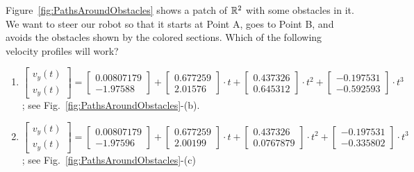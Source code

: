 \begin{example} Figure~\ref{fig:PathsAroundObstacles} shows a patch of $\mathbb R^2$ with some obstacles in it. We want to steer our robot so that it starts at Point A, goes to Point B, and avoids the obstacles shown by the colored sections. Which of the following velocity profiles will work? 

\begin{enumerate}[label=(\roman*)]
\setlength{\itemsep}{.2cm}
\item $\begin{bmatrix} v_y(t) \\ v_y(t)\end{bmatrix} =  
        \begin{bmatrix}      0.00807179 \\ -1.97588  \end{bmatrix}  + 
        \begin{bmatrix}      0.677259   \\  2.01576 \end{bmatrix} \cdot t 
        + \begin{bmatrix}   0.437326  \\   0.645312 \end{bmatrix} \cdot t^2  
        + \begin{bmatrix}   -0.197531  \\  -0.592593 \end{bmatrix} \cdot  t^3 
        $; see Fig.~\ref{fig:PathsAroundObstacles}-(b).

    \item $\begin{bmatrix} v_y(t) \\ v_y(t)\end{bmatrix} =  
    \begin{bmatrix}    0.00807179 \\ -1.97596  \end{bmatrix}  + 
        \begin{bmatrix}   0.677259   \\  2.00199\end{bmatrix} \cdot t +
        \begin{bmatrix}  0.437326   \\  0.0767879 \end{bmatrix} \cdot t^2  + 
        \begin{bmatrix}  -0.197531  \\ -0.335802
    \end{bmatrix} \cdot  t^3$; see Fig.~\ref{fig:PathsAroundObstacles}-(c)
\end{enumerate}   
\end{example}

